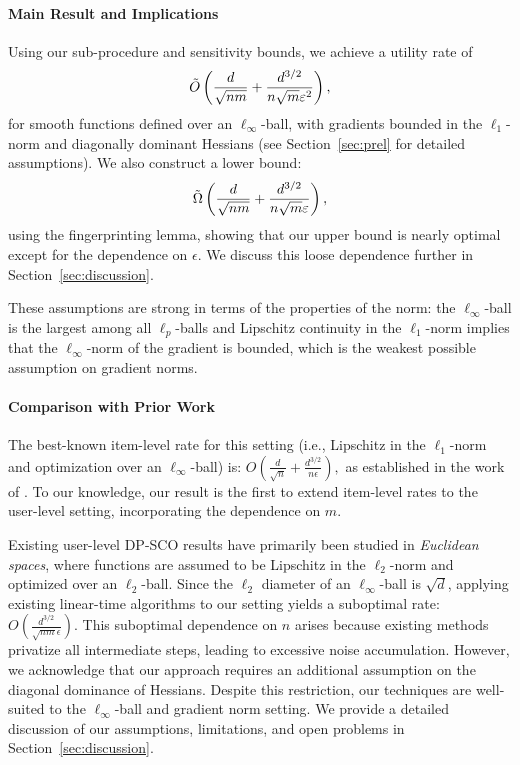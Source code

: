 \paragraph{Main Result and Implications}  
Using our sub-procedure and sensitivity bounds, we achieve a utility rate of  
\[
\Tilde{O}\left(\frac{d}{\sqrt{nm}} + \frac{d^{3/2}}{n\sqrt{m}\epsilon^2}\right),
\]  
for smooth functions defined over an $\ell_\infty$-ball, with gradients bounded in the $\ell_1$-norm and diagonally dominant Hessians (see Section~\ref{sec:prel} for detailed assumptions). We also construct a lower bound:  
\[
\Tilde{\Omega}\left(\frac{d}{\sqrt{nm}} + \frac{d^{3/2}}{n\sqrt{m}\epsilon}\right),
\]  
using the fingerprinting lemma, showing that our upper bound is nearly optimal except for the dependence on $\epsilon$.  
We discuss this loose dependence further in Section~\ref{sec:discussion}.

These assumptions are strong in terms of the properties of the norm: the $\ell_\infty$-ball is the largest among all $\ell_p$-balls and Lipschitz continuity in the $\ell_1$-norm implies that the $\ell_\infty$-norm of the gradient is bounded, which is the weakest possible assumption on gradient norms.

\paragraph{Comparison with Prior Work}  
The best-known item-level rate for this setting (i.e., Lipschitz in the $\ell_1$-norm and optimization over an $\ell_\infty$-ball) is:  
$ 
O\left(\frac{d}{\sqrt{n}} + \frac{d^{3/2}}{n\epsilon}\right),
$  
as established in the work of \cite{asi2021private}. To our knowledge, our result is the first to extend item-level rates to the user-level setting, incorporating the dependence on $m$.

Existing user-level DP-SCO results have primarily been studied in \textit{Euclidean spaces}, where functions are assumed to be Lipschitz in the $\ell_2$-norm and optimized over an $\ell_2$-ball. Since the $\ell_2$ diameter of an $\ell_\infty$-ball is $\sqrt{d}$, applying existing linear-time algorithms to our setting yields a suboptimal rate:  
$
O\left(\frac{d^{3/2}}{\sqrt{nm}\epsilon}\right).
$ 
This suboptimal dependence on $n$ arises because existing methods privatize all intermediate steps, leading to excessive noise accumulation. However, we acknowledge that our approach requires an additional assumption on the diagonal dominance of Hessians. Despite this restriction, our techniques are well-suited to the $\ell_\infty$-ball and gradient norm setting. We provide a detailed discussion of our assumptions, limitations, and open problems in Section~\ref{sec:discussion}.


